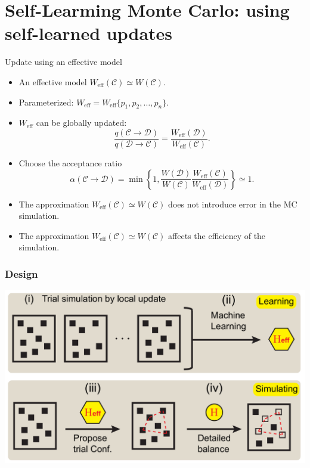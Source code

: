 \documentclass[xcolor=table, 10pt, aspectratio=169]{beamer}
\begin{document}
\section{Self-Learming Monte Carlo: using self-learned updates}

\begin{frame}{Update using an effective model}
\begin{itemize}
\item An effective model $W_{\text{eff}}(\mathcal C)\simeq W(\mathcal C)$.
\item Parameterized: $W_{\text{eff}}=W_{\text{eff}}\{p_1,p_2,\ldots,p_n\}$.
\item $W_{\text{eff}}$ can be globally updated:
\[\frac{q(\mathcal C\rightarrow\mathcal D)}{q(\mathcal D\rightarrow\mathcal C)}
=\frac{W_{\text{eff}}(\mathcal D)}{W_{\text{eff}}(\mathcal C)}.\]
\item Choose the acceptance ratio
\[\alpha(\mathcal C\rightarrow\mathcal D) =
\min\left\{1, \frac{W(\mathcal D)}{W(\mathcal C)}
\frac{W_{\text{eff}}(\mathcal C)}{W_{\text{eff}}(\mathcal D)}
\right\}\simeq1.\]
\item The approximation $W_{\text{eff}}(\mathcal C)\simeq W(\mathcal C)$ does not introduce error in the MC simulation.
\item The approximation $W_{\text{eff}}(\mathcal C)\simeq W(\mathcal C)$ affects the efficiency of the simulation.
\end{itemize}
\end{frame}

\begin{frame}
  \frametitle{Design}
  \begin{center}
    \includegraphics[width=.8\textwidth]{Fig1}
  \end{center}
\end{frame}
\end{document}
